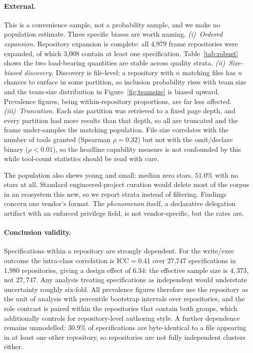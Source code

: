 \documentclass[smallextended,natbib]{svjour3}
\begin{document}
\paragraph{External.} This is a convenience sample, not a probability sample, and we make no
population estimate. Three specific biases are worth naming. \emph{(i)~Ordered expansion.} Repository
expansion is complete: all 4{,}979 frame repositories were expanded, of which 3{,}008 contain at least
one specification. Table~\ref{tab:robust} shows the two load-bearing quantities are stable across
quality strata.
\emph{(ii)~Size-biased discovery.} Discovery is file-level: a repository with $n$ matching files has
$n$ chances to surface in some partition, so inclusion probability rises with team size and the
team-size distribution in Figure~\ref{fig:teamsize} is biased upward. Prevalence figures, being
within-repository proportions, are far less affected. \emph{(iii)~Truncation.} Each size partition
was retrieved to a fixed page depth, and every partition had more results than that depth, so all
are truncated and the frame under-samples the matching population.
File size correlates with the number of tools granted (Spearman $\rho=0.32$) but not with the
omit/declare binary ($\rho<0.01$), so the headline capability measure is not confounded by this while
tool-count statistics should be read with care.

The population also skews young and small: median zero stars, $51.0\%$ with no stars at all. Standard
engineered-project curation would delete most of the corpus in an ecosystem this new, so we report
strata instead of filtering. Findings concern one vendor's format. The \emph{phenomenon} itself, a
declarative delegation artifact with an enforced privilege field, is not vendor-specific, but the
rates are.

\paragraph{Conclusion validity.} Specifications within a repository are strongly dependent. For the
write/exec outcome the intra-class correlation is $\mathrm{ICC}=0.41$ over 27{,}747 specifications in
1{,}980 repositories, giving a design effect of $6.34$: the effective sample size is $4{,}373$, not
$27{,}747$. Any analysis treating specifications as independent would understate uncertainty roughly
six-fold.
All prevalence figures therefore use the repository as the unit of analysis with percentile bootstrap
intervals over repositories, and the role contrast is paired within the repositories that contain both
groups, which additionally controls for repository-level authoring style. A further dependence remains
unmodelled: $30.9\%$ of specifications are byte-identical to a file appearing in at least one other
repository, so repositories are not fully independent clusters either.
\end{document}
